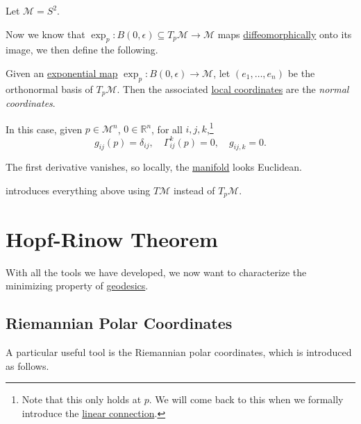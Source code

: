 \begin{eg}
	Let \(\mathcal{M} = S^2\).
	\begin{center}
	\end{center}
\end{eg}

Now we know that \(\exp _p\colon B(0, \epsilon ) \subseteq T_p \mathcal{M} \to \mathcal{M} \) maps \hyperref[def:diffeomorphic]{diffeomorphically} onto its image, we then define the following.

\begin{definition}\label{def:normal-coordinate}
	Given an \hyperref[def:exponential-map]{exponential map} \(\exp _p\colon B(0, \epsilon ) \to \mathcal{M} \), let \((e_1, \dots , e_n)\) be the orthonormal basis of \(T_p \mathcal{M} \). Then the associated \hyperref[def:coordinate-chart]{local coordinates} are the \emph{normal coordinates}.
\end{definition}

In this case, given \(p\in \mathcal{M} ^n\), \(0\in \mathbb{R} ^n\), for all \(i, j, k\),\footnote{Note that this only holds at \(p\). We will come back to this when we formally introduce the \hyperref[def:linear-connection]{linear connection}.}
\[
	g_{ij}(p) = \delta_{ij},\quad \Gamma _{ij}^k(p) = 0,\quad g_{ij, k} = 0.
\]

\begin{intuition}
	The first derivative vanishes, so locally, the \hyperref[def:Riemannian-manifold]{manifold} looks Euclidean.
\end{intuition}

\begin{note}
	\cite{flaherty2013riemannian} introduces everything above using \(T\mathcal{M} \) instead of \(T_p \mathcal{M} \).
\end{note}

\section{Hopf-Rinow Theorem}
With all the tools we have developed, we now want to characterize the minimizing property of \hyperref[def:geodesic]{geodesics}.

\subsection{Riemannian Polar Coordinates}
A particular useful tool is the Riemannian polar coordinates, which is introduced as follows.

